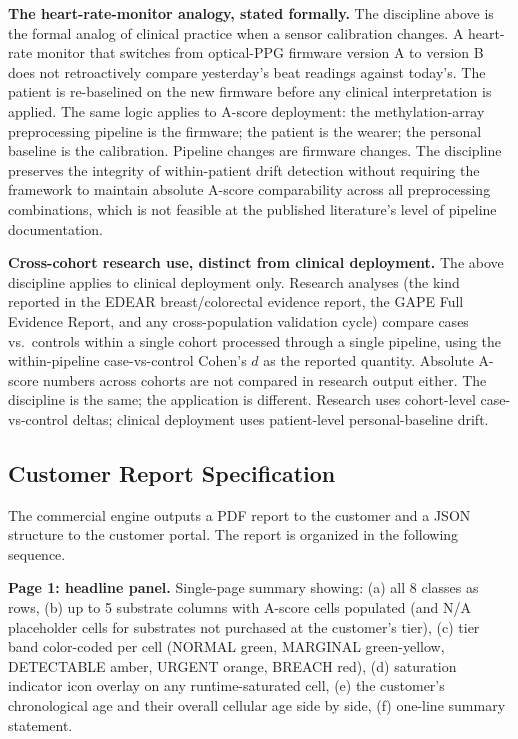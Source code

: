 \documentclass[12pt,a4paper]{article}
\begin{document}
\textbf{The heart-rate-monitor analogy, stated formally.} The
discipline above is the formal analog of clinical practice when a
sensor calibration changes. A heart-rate monitor that switches from
optical-PPG firmware version A to version B does not retroactively
compare yesterday's beat readings against today's. The patient is
re-baselined on the new firmware before any clinical interpretation is
applied. The same logic applies to A-score deployment: the
methylation-array preprocessing pipeline is the firmware; the patient
is the wearer; the personal baseline is the calibration. Pipeline
changes are firmware changes. The discipline preserves the integrity
of within-patient drift detection without requiring the framework to
maintain absolute A-score comparability across all preprocessing
combinations, which is not feasible at the published literature's
level of pipeline documentation.

\textbf{Cross-cohort research use, distinct from clinical deployment.}
The above discipline applies to clinical deployment only. Research
analyses (the kind reported in the EDEAR breast/colorectal evidence
report, the GAPE Full Evidence Report, and any cross-population
validation cycle) compare cases vs.~controls within a single cohort
processed through a single pipeline, using the within-pipeline
case-vs-control Cohen's $d$ as the reported quantity. Absolute
A-score numbers across cohorts are not compared in research output
either. The discipline is the same; the application is different.
Research uses cohort-level case-vs-control deltas; clinical
deployment uses patient-level personal-baseline drift.

\subsection{Customer Report Specification}
\label{subsec:customer_report}

The commercial engine outputs a PDF report to the customer and a
JSON structure to the customer portal. The report is organized in
the following sequence.

\textbf{Page 1: headline panel.} Single-page summary showing: (a) all
8 classes as rows, (b) up to 5 substrate columns with A-score cells
populated (and N/A placeholder cells for substrates not purchased at
the customer's tier), (c) tier band color-coded per cell
(NORMAL green, MARGINAL green-yellow, DETECTABLE amber, URGENT orange,
BREACH red), (d) saturation indicator icon overlay on any runtime-saturated cell,
(e) the customer's chronological age and their overall cellular age
side by side, (f) one-line summary statement.
\end{document}
